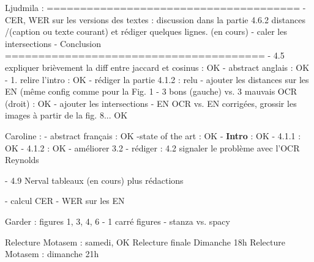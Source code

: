 Ljudmila : 
======================================
- CER, WER sur les versions des textes : discussion dans la partie 4.6.2 distances /(caption ou texte courant)  et rédiger quelques lignes. (en cours)
- caler les intersections
- Conclusion
=======================================
- 4.5 expliquer brièvement la diff entre jaccard et cosinus : OK
- abstract anglais : OK
- 1. relire l'intro : OK
- rédiger la partie 4.1.2 : relu
- ajouter les distances sur les EN (même config comme pour la Fig. 1 - 3 bons (gauche) vs. 3 mauvais OCR (droit) : OK
- ajouter les intersections - EN OCR vs. EN corrigées, grossir les images à partir de la fig. 8... OK



Caroline : 
- abstract français : OK
-state of the art : OK
-\textbf{ Intro} : OK
- 4.1.1 : OK
- 4.1.2 : OK
- améliorer 3.2
- rédiger : 4.2 signaler le problème avec l'OCR Reynolds

- 4.9 Nerval tableaux (en cours) plus rédactions 

- calcul CER - WER sur les EN



Garder : figures 1, 3, 4, 6 - 1 carré
         figures - stanza vs. spacy

Relecture Motasem : samedi, OK
Relecture finale Dimanche 18h
Relecture Motasem : dimanche 21h
